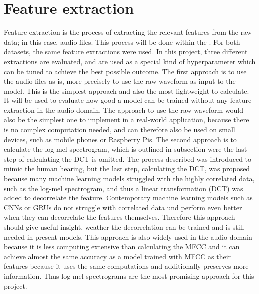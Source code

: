 \section{Feature extraction}
\label{sec:Feature-Extraction}
Feature extraction is the process of extracting the relevant features from the raw data; in this case, audio files. This process will be done within the . For both datasets, the same feature extractions were used. In this project, three different extractions are evaluated, and are used as a special kind of hyperparameter which can be tuned to achieve the best possible outcome.
\newline
\newline
The first approach is to use the audio files as-is, more precisely to use the raw waveform as input to the model. This is the simplest approach and also the most lightweight to calculate. It will be used to evaluate how good a model can be trained without any feature extraction in the audio domain. The approach to use the raw waveform would also be the simplest one to implement in a real-world application, because there is no complex computation needed, and can therefore also be used on small devices, such as mobile phones or Raspberry Pis.
\newline
\newline
The second approach is to calculate the log-mel spectrogram, which is outlined in subsection  were the last step of calculating the \gls{DCT} is omitted. The process described was introduced to mimic the human hearing, but the last step, calculating the \gls{DCT}, was proposed because many machine learning models struggled with the highly correlated data, such as the log-mel spectrogram, and thus a linear transformation (\gls{DCT}) was added to decorrelate the feature. Contemporary machine learning models such as CNNs or GRUs do not struggle with correlated data und perform even better when they can decorrelate the features themselves. Therefore this approach should give useful insight, weather the decorrelation can be trained and is still needed in present models.
\newline
This approach is also widely used in the audio domain because it is less computing extensive than calculating the \gls{MFCC} and it can achieve almost the same accuracy as a model trained with \gls{MFCC} as their features because it uses the same computations and additionally preserves more information. Thus log-mel spectrograms are the most promising approach for this project.
